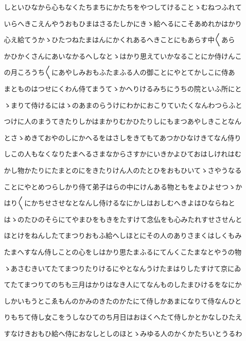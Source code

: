 \documentclass[a4paper,11pt,landscape]{ltjtarticle}
\begin{document}
\par\medskip
しといひなから心もなくたちまちにかたちをやつしてけることゝむねつふれて
\par\medskip
いらへきこえんやうおもひまはさるたしかにきゝ給へるにこそあめれかはかり
\par\medskip
心え給てうかゝひたつねたまはんにかくれあるへきことにもあらす中〱あら
\par\medskip
かひかくさんにあいなかるへしなとゝはかり思えていかなることにか侍けんこ
\par\medskip
の月ころうち〱にあやしみおもふたまふる人の御ことにやとてかしこに侍あ
\par\medskip
まとものはつせにくわん侍てまうてゝかへりけるみちにうちの院といふ所にと
\par\medskip
ゝまりて侍けるにはゝのあまのらうけにわかにおこりていたくなんわつらふと
\par\medskip
つけに人のまうてきたりしかはまかりむかひたりしにもまつあやしきことなん
\par\medskip
とさゝめきておやのしにかへるをはさしをきてもてあつかひなけきてなん侍り
\par\medskip
しこの人もなくなりたまへるさまなからさすかにいきかよひておはしけれはむ
\par\medskip
かし物かたりにたまとのにをきたりけん人のたとひをおもひいてゝさやうなる
\par\medskip
ことにやとめつらしかり侍て弟子はらの中にけんある物ともをよひよせつゝか
\par\medskip
はり〱にかちせさせなとなんし侍けるなにかしはおしむへきよはひならねと
\par\medskip
はゝのたひのそらにてやまひをもきをたすけて念仏をも心みたれすせさせんと
\par\medskip
ほとけをねんしたてまつりおもふ給へしほとにその人のありさまくはしくもみ
\par\medskip
たまへすなん侍しことの心をしはかり思たまふるにてんくこたまなとやうの物
\par\medskip
ゝあさむきいてたてまつりたりけるにやとなんうけたまはりしたすけて京にゐ
\par\medskip
てたてまつりてのちも三月はかりはなき人にてなんものしたまひけるをなにか
\par\medskip
しかいもうとこゑもんのかみのきたのかたにて侍しかあまになりて侍なんひと
\par\medskip
りもちて侍し女こをうしなひてのち月日はおほくへたて侍しかとかなしひたえ
\par\medskip
すなけきおもひ給へ侍におなしとしのほとゝみゆる人のかくかたちいとうるわ
\par\medskip
\end{document}
